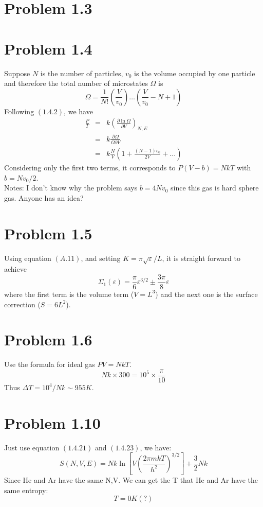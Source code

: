 \documentclass{article}
\begin{document}
\section*{Problem 1.3}

\section*{Problem 1.4}
Suppose $N$ is the number of particles, $v_{0}$ is the volume occupied by one particle and therefore the total number of microstates $\Omega$ is
\begin{equation}
\Omega = \frac{1}{N!}(\frac{V}{v_{0}}) \dots (\frac{V}{v_{0}}-N+1)
\end{equation}
Following $(1.4.2)$, we have
\begin{eqnarray}
\frac{P}{T} &=& k \left(\frac{\partial \ln \Omega}{\partial V}\right)_{N,E} \\
&=& k \frac{\partial \Omega}{\Omega \partial V} \\
&=& k \frac{N}{V} \left(1+ \frac{(N-1)v_{0}}{2V} + \dots \right)
\end{eqnarray}
Considering only the first two terms, it corresponds to $P(V-b) = NkT$ with $b=N v_{0}/2$. \\
Notes: I don't know why the problem says $b=4N v_{0}$ since this gas is hard sphere gas. Anyone has an idea?


\section*{Problem 1.5}
Using equation $(A.11)$, and setting $K = \pi \sqrt{\varepsilon}/L$, it is straight forward to achieve
\begin{equation}
\Sigma_{1}(\varepsilon) = \frac{\pi}{6}\varepsilon^{3/2} \pm \frac{3 \pi}{8} \varepsilon
\end{equation}
where the first term is the volume term ($V=L^{3}$) and the next one is the surface correction ($S=6L^{2}$).



\section*{Problem 1.6}
Use the formula for ideal gas $PV=NkT$.
\begin{equation}
N k \times 300= 10^{5} \times \frac{\pi}{10}
\end{equation}
Thus $\Delta T = 10^{4}/Nk \sim 955 K$.

\section*{Problem 1.10}
    Just use equation $(1.4.21)$ and $(1.4.23)$, we have:
    \begin{equation}
        S(N,V,E)=Nk\ln \left[V\left(\frac{2\pi m k T}{h^2}\right)^{3/2}\right]+\frac{3}{2}Nk
    \end{equation}
    Since He and Ar have the same N,V. We can get the T that He and Ar have the same entropy:
    $$
        T=0K (?)
    $$
\end{document}
